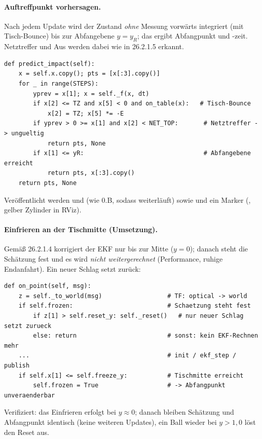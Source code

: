 \paragraph{Auftreffpunkt vorhersagen.} Nach jedem Update wird der Zustand
\emph{ohne} Messung vorwärts integriert (mit Tisch-Bounce) bis zur Abfangebene
$y=y_R$; das ergibt Abfangpunkt und -zeit. Netztreffer und Aus werden dabei wie
in 26.2.1.5 erkannt.
\begin{lstlisting}[style=py,caption={\code{predict\_impact} -- Bounce, Netz, Abfangebene}]
def predict_impact(self):
    x = self.x.copy(); pts = [x[:3].copy()]
    for _ in range(STEPS):
        yprev = x[1]; x = self._f(x, dt)
        if x[2] <= TZ and x[5] < 0 and on_table(x):   # Tisch-Bounce
            x[2] = TZ; x[5] *= -E
        if yprev > 0 >= x[1] and x[2] < NET_TOP:       # Netztreffer -> ungueltig
            return pts, None
        if x[1] <= yR:                                 # Abfangebene erreicht
            return pts, x[:3].copy()
    return pts, None
\end{lstlisting}
\noindent Veröffentlicht werden  und 
(wie 0.B, sodass  weiterläuft) sowie  und
ein Marker (, gelber Zylinder in RViz).

\paragraph{Einfrieren an der Tischmitte (Umsetzung).} Gemäß 26.2.1.4 korrigiert
der EKF nur bis zur Mitte ($y=0$); danach steht die Schätzung fest und es wird
\emph{nicht weitergerechnet} (Performance, ruhige Endanfahrt). Ein neuer Schlag
setzt zurück:
\begin{lstlisting}[style=py,caption={\code{flight\_ekf} -- Einfrieren und Reset}]
def on_point(self, msg):
    z = self._to_world(msg)                  # TF: optical -> world
    if self.frozen:                          # Schaetzung steht fest
        if z[1] > self.reset_y: self._reset()   # nur neuer Schlag setzt zurueck
        else: return                         # sonst: kein EKF-Rechnen mehr
    ...                                      # init / ekf_step / publish
    if self.x[1] <= self.freeze_y:           # Tischmitte erreicht
        self.frozen = True                   # -> Abfangpunkt unveraenderbar
\end{lstlisting}
\noindent Verifiziert: das Einfrieren erfolgt bei $y\approx0$; danach bleiben
Schätzung und Abfangpunkt identisch (keine weiteren Updates), ein Ball wieder bei
$y>1{,}0$ löst den Reset aus.

